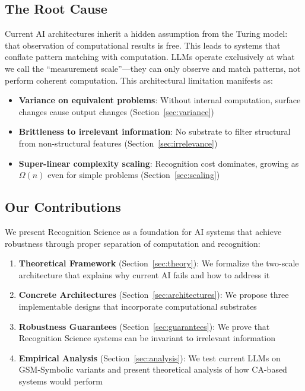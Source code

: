 \documentclass[11pt,letterpaper]{article}
\theoremstyle{plain}
\theoremstyle{definition}
\theoremstyle{remark}
\begin{document}
\subsection{The Root Cause}

Current AI architectures inherit a hidden assumption from the Turing model: that observation of computational results is free. This leads to systems that conflate pattern matching with computation. LLMs operate exclusively at what we call the ``measurement scale''—they can only observe and match patterns, not perform coherent computation. This architectural limitation manifests as:

\begin{itemize}
\item \textbf{Variance on equivalent problems}: Without internal computation, surface changes cause output changes (Section~\ref{sec:variance})
\item \textbf{Brittleness to irrelevant information}: No substrate to filter structural from non-structural features (Section~\ref{sec:irrelevance})
\item \textbf{Super-linear complexity scaling}: Recognition cost dominates, growing as $\Omega(n)$ even for simple problems (Section~\ref{sec:scaling})
\end{itemize}

\subsection{Our Contributions}

We present Recognition Science as a foundation for AI systems that achieve robustness through proper separation of computation and recognition:

\begin{enumerate}
\item \textbf{Theoretical Framework} (Section~\ref{sec:theory}): We formalize the two-scale architecture that explains why current AI fails and how to address it
\item \textbf{Concrete Architectures} (Section~\ref{sec:architectures}): We propose three implementable designs that incorporate computational substrates
\item \textbf{Robustness Guarantees} (Section~\ref{sec:guarantees}): We prove that Recognition Science systems can be invariant to irrelevant information
\item \textbf{Empirical Analysis} (Section~\ref{sec:analysis}): We test current LLMs on GSM-Symbolic variants and present theoretical analysis of how CA-based systems would perform
\end{enumerate}
\end{document}
